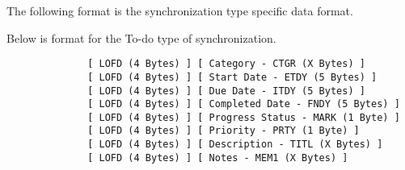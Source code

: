             The following format is the synchronization type specific data
            format.

            Below is format for the To-do type of synchronization.

            \begin{verbatim}
              [ LOFD (4 Bytes) ] [ Category - CTGR (X Bytes) ]
              [ LOFD (4 Bytes) ] [ Start Date - ETDY (5 Bytes) ]
              [ LOFD (4 Bytes) ] [ Due Date - ITDY (5 Bytes) ]
              [ LOFD (4 Bytes) ] [ Completed Date - FNDY (5 Bytes) ]
              [ LOFD (4 Bytes) ] [ Progress Status - MARK (1 Byte) ]
              [ LOFD (4 Bytes) ] [ Priority - PRTY (1 Byte) ]
              [ LOFD (4 Bytes) ] [ Description - TITL (X Bytes) ]
              [ LOFD (4 Bytes) ] [ Notes - MEM1 (X Bytes) ]
            \end{verbatim}

